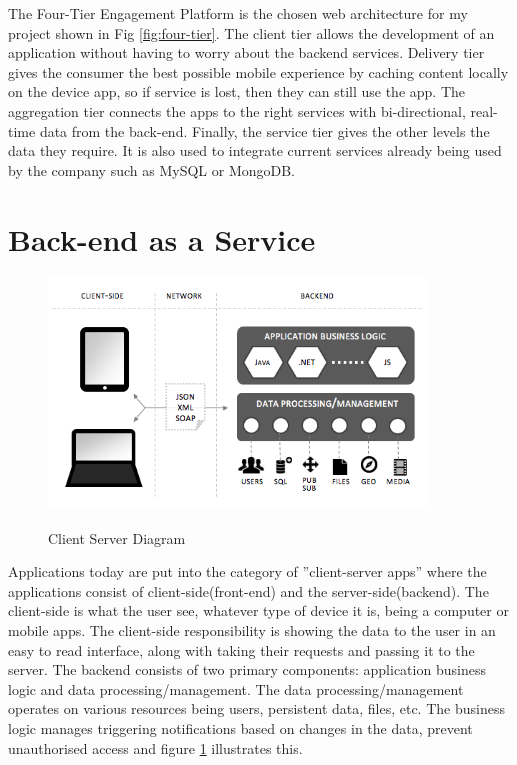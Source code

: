 The Four-Tier Engagement Platform is the chosen web architecture for my project shown in Fig \ref{fig:four-tier}. The client tier allows the development of an application without having to worry about the backend services. Delivery tier gives the consumer the best possible mobile experience by caching content locally on the device app, so if service is lost, then they can still use the app. The aggregation tier connects the apps to the right services with bi-directional, real-time data from the back-end. Finally, the service tier gives the other levels the data they require. It is also used to integrate current services already being used by the company such as MySQL or MongoDB.

\section{Back-end as a Service}

\begin{figure}[!h]
    \caption{Client Server Diagram \cite{backendless} }
    \centering
    \includegraphics[width=100mm]{images/client-server-diagram}
    \label{fig:client-server}
\end{figure}

Applications today are put into the category of ”client-server apps” where the applications consist of client-side(front-end) and the server-side(backend). The client-side is what the user see, whatever type of device it is, being a computer or mobile apps. The client-side responsibility is showing the data to the user in an easy to read interface, along with taking their requests and passing it to the server. The backend consists of two primary components: application business logic and data processing/management. The data processing/management operates on various resources being users, persistent data, files, etc. The business logic manages triggering notifications based on changes in the data, prevent unauthorised access and figure \ref{fig:client-server} illustrates this.

